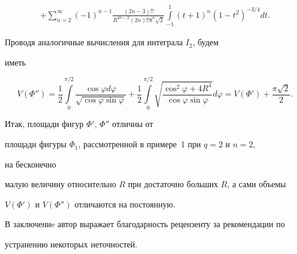 \begin{exam}
\begin{multline*}
+\sum_{n=2}^{\infty}


(-1)^{n-1}\frac{(2n-3)!!}{R^{4n-2}(2n)!! 8^n\sqrt{2}}


\int\limits_{-1}^1{(t+1)^n(1-t^2)^{-3/4}dt}.


\end{multline*}


Проводя аналогичные вычисления для интеграла $I_2$, будем


иметь


$$


V(\Phi'')=\frac{1}{2}\int\limits_0^{\pi/2}


\frac{\cos\varphi d\varphi}{\sqrt{\cos\varphi\sin\varphi}}+


\frac{1}{2}\int\limits_0^{\pi/2}\sqrt{\frac{\cos^2\varphi+4R^4}


{\cos\varphi\sin\varphi}}d\varphi=V(\Phi')+\frac{\pi\sqrt 2}{2}.


$$


Итак, площади фигур $\Phi'$, $\Phi''$ отличны от


площади фигуры $\Phi_1$, рассмотренной в примере~1 при $q=2$ и $n=2$,


на бесконечно


малую величину относительно $R$ при достаточно больших $R$, а сами объемы


$V (\Phi')$ и $V (\Phi'')$ отличаются на постоянную.


\end{exam}





В заключениe автор выражает благодарность рецензенту за рекомендации по


устранению некоторых неточностей.





